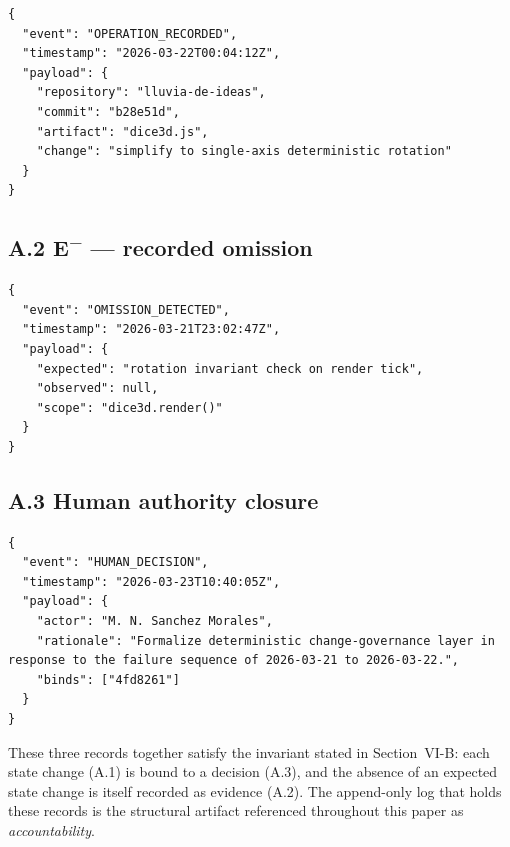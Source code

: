 \documentclass[conference]{IEEEtran}
\begin{document}
\begin{lstlisting}[basicstyle=\ttfamily\scriptsize,caption={Example governance event: recorded occurrence (E\textsuperscript{+}).},label={lst:recorded-occurrence}]
{
  "event": "OPERATION_RECORDED",
  "timestamp": "2026-03-22T00:04:12Z",
  "payload": {
    "repository": "lluvia-de-ideas",
    "commit": "b28e51d",
    "artifact": "dice3d.js",
    "change": "simplify to single-axis deterministic rotation"
  }
}
\end{lstlisting}

\subsection*{A.2 E\textsuperscript{$-$} --- recorded omission}

\begin{lstlisting}[basicstyle=\ttfamily\scriptsize,caption={Example governance event: recorded omission (E\textsuperscript{$-$}).},label={lst:recorded-omission}]
{
  "event": "OMISSION_DETECTED",
  "timestamp": "2026-03-21T23:02:47Z",
  "payload": {
    "expected": "rotation invariant check on render tick",
    "observed": null,
    "scope": "dice3d.render()"
  }
}
\end{lstlisting}

\subsection*{A.3 Human authority closure}

\begin{lstlisting}[basicstyle=\ttfamily\scriptsize,breaklines=true,breakatwhitespace=true,columns=fullflexible,caption={Example governance event: human authority closure.},label={lst:human-authority-closure}]
{
  "event": "HUMAN_DECISION",
  "timestamp": "2026-03-23T10:40:05Z",
  "payload": {
    "actor": "M. N. Sanchez Morales",
    "rationale": "Formalize deterministic change-governance layer in response to the failure sequence of 2026-03-21 to 2026-03-22.",
    "binds": ["4fd8261"]
  }
}
\end{lstlisting}

These three records together satisfy the invariant stated in Section~VI-B: each state change (A.1) is bound to a decision (A.3), and the absence of an expected state change is itself recorded as evidence (A.2). The append-only log that holds these records is the structural artifact referenced throughout this paper as \emph{accountability}.
\end{document}
